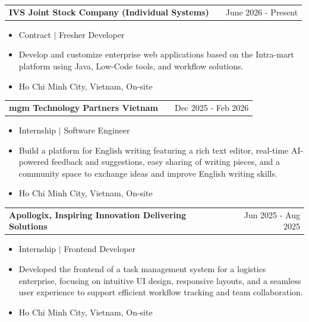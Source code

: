 \documentclass[a4paper,12pt]{article}
\makeatletter
\newenvironment{jobshort}[2]
    {
    \begin{tabularx}{\linewidth}{@{}l X r@{}}
    \textbf{#1} & \hfill &  #2 \\[3.75pt]
    \end{tabularx}
    }
    {
    }
\newenvironment{joblong}[2]
    {
    \begin{tabularx}{\linewidth}{@{}l X r@{}}
    \textbf{#1} & \hfill &  #2 \\[3.75pt]
    \end{tabularx}
    \begin{minipage}[t]{\linewidth}
    \begin{itemize}[nosep,after=\strut, leftmargin=1em, itemsep=3pt,label=--]
    }
    {
    \end{itemize}
    \end{minipage}    
    }
\makeatother
\begin{document}

\begin{joblong}{IVS Joint Stock Company (Individual Systems)}{June 2026 - Present}
\item Contract $|$ Fresher Developer
\item Develop and customize enterprise web applications based on the Intra-mart platform using Java, Low-Code tools, and workflow solutions.
\item Ho Chi Minh City, Vietnam, On-site
\end{joblong}

\begin{joblong}{mgm Technology Partners Vietnam}{Dec 2025 - Feb 2026}
\item Internship $|$ Software Engineer
\item Build a platform for English writing featuring a rich text editor, real-time AI-powered feedback and suggestions, easy sharing of writing pieces, and a community space to exchange ideas and improve English writing skills.
\item Ho Chi Minh City, Vietnam, On-site
\end{joblong}

\begin{joblong}{Apollogix, Inspiring Innovation Delivering Solutions}{Jun 2025 - Aug 2025}
\item Internship $|$ Frontend Developer
\item Developed the frontend of a task management system for a logistics enterprise, focusing on intuitive UI design, responsive layouts, and a seamless user experience to support efficient workflow tracking and team collaboration.
\item Ho Chi Minh City, Vietnam, On-site
\end{joblong}

\end{document}
